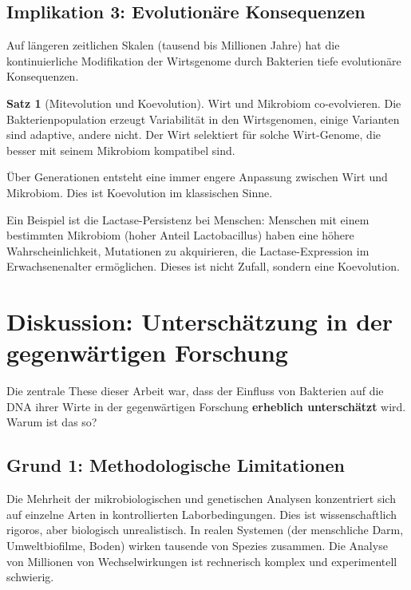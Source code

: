 \documentclass[a4paper,12pt]{article}
\theoremstyle{definition}
\newtheorem{satz}{Satz}
\begin{document}
\subsection{Implikation 3: Evolutionäre Konsequenzen}

Auf längeren zeitlichen Skalen (tausend bis Millionen Jahre) hat die kontinuierliche Modifikation der Wirtsgenome durch Bakterien tiefe evolutionäre Konsequenzen.

\begin{satz}[Mitevolution und Koevolution]
Wirt und Mikrobiom co-evolvieren. Die Bakterienpopulation erzeugt Variabilität in den Wirtsgenomen, einige Varianten sind adaptive, andere nicht. Der Wirt selektiert für solche Wirt-Genome, die besser mit seinem Mikrobiom kompatibel sind.

Über Generationen entsteht eine immer engere Anpassung zwischen Wirt und Mikrobiom. Dies ist Koevolution im klassischen Sinne.

Ein Beispiel ist die Lactase-Persistenz bei Menschen: Menschen mit einem bestimmten Mikrobiom (hoher Anteil Lactobacillus) haben eine höhere Wahrscheinlichkeit, Mutationen zu akquirieren, die Lactase-Expression im Erwachsenenalter ermöglichen. Dieses ist nicht Zufall, sondern eine Koevolution.
\end{satz}

\section{Diskussion: Unterschätzung in der gegenwärtigen Forschung}


Die zentrale These dieser Arbeit war, dass der Einfluss von Bakterien auf die DNA ihrer Wirte in der gegenwärtigen Forschung \textbf{erheblich unterschätzt} wird. Warum ist das so?

\subsection{Grund 1: Methodologische Limitationen}

Die Mehrheit der mikrobiologischen und genetischen Analysen konzentriert sich auf einzelne Arten in kontrollierten Laborbedingungen. Dies ist wissenschaftlich rigoros, aber biologisch unrealistisch. In realen Systemen (der menschliche Darm, Umweltbiofilme, Boden) wirken tausende von Spezies zusammen. Die Analyse von Millionen von Wechselwirkungen ist rechnerisch komplex und experimentell schwierig.
\end{document}
